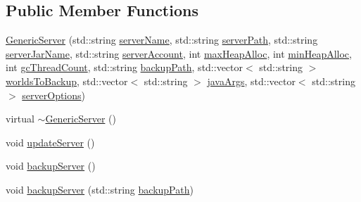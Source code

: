 \subsection*{Public Member Functions}
\begin{DoxyCompactItemize}
\item 
\hyperlink{class_minecraft_server_service_1_1_generic_server_a5e50ec81786b021ea76f3efbbd5ce5b6}{Generic\+Server} (std\+::string \hyperlink{class_minecraft_server_service_1_1_generic_server_a5586cb49baa6e827fd2d755dfa3b5c5d}{server\+Name}, std\+::string \hyperlink{class_minecraft_server_service_1_1_generic_server_a10ccbcf30f81af95aa5e75726f2c1d80}{server\+Path}, std\+::string \hyperlink{class_minecraft_server_service_1_1_generic_server_add9023bc7c35b390e67507493449f7a5}{server\+Jar\+Name}, std\+::string \hyperlink{class_minecraft_server_service_1_1_generic_server_a0192c45acc976639f38aa7206586abcf}{server\+Account}, int \hyperlink{class_minecraft_server_service_1_1_generic_server_a025ace4dd732e9e1a3d47e695ebfabc1}{max\+Heap\+Alloc}, int \hyperlink{class_minecraft_server_service_1_1_generic_server_a75978615a6ba8576a5d97664ffd85142}{min\+Heap\+Alloc}, int \hyperlink{class_minecraft_server_service_1_1_generic_server_ad3e3e744983ef46efed8f5d2189e353f}{gc\+Thread\+Count}, std\+::string \hyperlink{class_minecraft_server_service_1_1_generic_server_a1f4d8509d45d7b8c6cb020499c1da17f}{backup\+Path}, std\+::vector$<$ std\+::string $>$ \hyperlink{class_minecraft_server_service_1_1_generic_server_a4add7010fca034d10e98ee0adb1c36cc}{worlds\+To\+Backup}, std\+::vector$<$ std\+::string $>$ \hyperlink{class_minecraft_server_service_1_1_generic_server_aed22e47eba34c39feb62ca62ad02dbb2}{java\+Args}, std\+::vector$<$ std\+::string $>$ \hyperlink{class_minecraft_server_service_1_1_generic_server_a1d5d6d5242a619f299427d18ab3969eb}{server\+Options})
\item 
virtual \hyperlink{class_minecraft_server_service_1_1_generic_server_a9274b1be2f47bd21c7df59c189d66cc4}{$\sim$\+Generic\+Server} ()
\item 
void \hyperlink{class_minecraft_server_service_1_1_generic_server_abb89d4233143d48e2f12ada83a7d0957}{update\+Server} ()
\item 
void \hyperlink{class_minecraft_server_service_1_1_generic_server_a20ffc509d921cb8e990c19bf26139714}{backup\+Server} ()
\item 
void \hyperlink{class_minecraft_server_service_1_1_generic_server_a99b71eeffc23ca9e6a61c82fb3255fba}{backup\+Server} (std\+::string \hyperlink{class_minecraft_server_service_1_1_generic_server_a1f4d8509d45d7b8c6cb020499c1da17f}{backup\+Path})

\end{DoxyCompactItemize}
